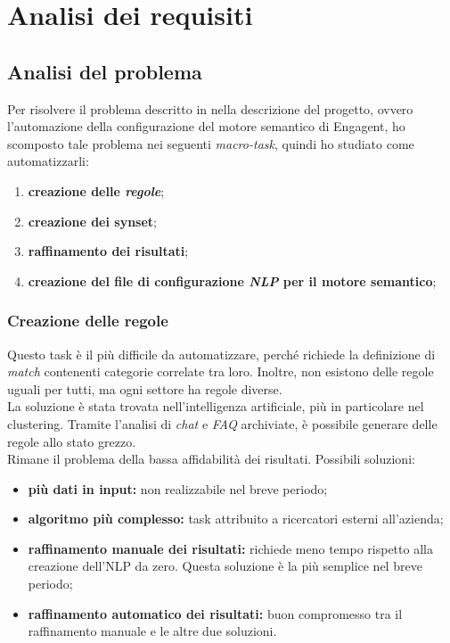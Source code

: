 
\chapter{Analisi dei requisiti}
\label{cap:analisi-requisiti}

\section{Analisi del problema}
Per risolvere il problema descritto in nella descrizione del progetto, ovvero l'automazione della configurazione del motore semantico di Engagent, ho scomposto tale problema nei seguenti \textit{macro-task}, quindi ho studiato come automatizzarli:
\begin{enumerate}
    \item \textbf{creazione delle \emph{regole}\glsfirstoccur};
    \item \textbf{creazione dei synset};
    \item \textbf{raffinamento dei risultati};
    \item \textbf{creazione del file di configurazione \emph{NLP} per il motore semantico};
\end{enumerate}

\subsection*{Creazione delle regole}\label{creazione_regole}
Questo task è il più difficile da automatizzare, perché richiede la definizione di \emph{match} contenenti categorie correlate tra loro. Inoltre, non esistono delle regole uguali per tutti, ma ogni settore ha regole diverse.\\
La soluzione è stata trovata nell'intelligenza artificiale, più in particolare nel clustering. Tramite l'analisi di \emph{chat} e \textit{FAQ}\glsfirstoccur{} archiviate, è possibile generare delle regole allo stato grezzo.\\
Rimane il problema della bassa affidabilità dei risultati. Possibili soluzioni:
\begin{itemize}
    \item \textbf{più dati in input:} non realizzabile nel breve periodo;
    \item \textbf{algoritmo più complesso:} task attribuito a ricercatori esterni all'azienda;
    \item \textbf{raffinamento manuale dei risultati:} richiede meno tempo rispetto alla creazione dell'NLP da zero. Questa soluzione è la più semplice nel breve periodo; 
    \item \textbf{raffinamento automatico dei risultati:} buon compromesso tra il raffinamento manuale e le altre due soluzioni.
\end{itemize}

